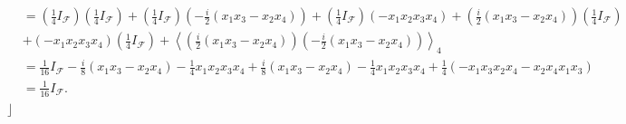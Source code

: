 \documentclass[aps,preprint]{revtex4}%
\begin{document}
\begin{align}
&  =\left(  \frac{1}{4}I_{\mathcal{F}}\right)  \left(  \frac{1}{4}%
I_{\mathcal{F}}\right)  +\left(  \frac{1}{4}I_{\mathcal{F}}\right)  \left(
-\frac{i}{2}\left(  x_{1}x_{3}-x_{2}x_{4}\right)  \right)  +\left(  \frac
{1}{4}I_{\mathcal{F}}\right)  \left(  -x_{1}x_{2}x_{3}x_{4}\right)  +\left(
\frac{i}{2}\left(  x_{1}x_{3}-x_{2}x_{4}\right)  \right)  \left(  \frac{1}%
{4}I_{\mathcal{F}}\right)  \\
&  +\left(  -x_{1}x_{2}x_{3}x_{4}\right)  \left(  \frac{1}{4}I_{\mathcal{F}%
}\right)  +\left\langle \left(  \frac{i}{2}\left(  x_{1}x_{3}-x_{2}%
x_{4}\right)  \right)  \left(  -\frac{i}{2}\left(  x_{1}x_{3}-x_{2}%
x_{4}\right)  \right)  \right\rangle _{4}\\
&  =\frac{1}{16}I_{\mathcal{F}}-\frac{i}{8}\left(  x_{1}x_{3}-x_{2}%
x_{4}\right)  -\frac{1}{4}x_{1}x_{2}x_{3}x_{4}+\frac{i}{8}\left(  x_{1}%
x_{3}-x_{2}x_{4}\right)  -\frac{1}{4}x_{1}x_{2}x_{3}x_{4}+\frac{1}{4}\left(
-x_{1}x_{3}x_{2}x_{4}-x_{2}x_{4}x_{1}x_{3}\right)  \\
&  =\frac{1}{16}I_{\mathcal{F}}.
\end{align}
$\rfloor$
\end{document}
